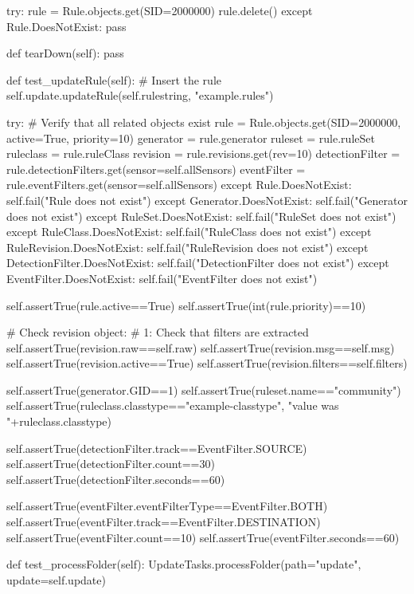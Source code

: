 \begin{python}[breaklines=true]
    try:
      rule = Rule.objects.get(SID=2000000)
      rule.delete()
    except Rule.DoesNotExist:
      pass


  def tearDown(self):
    pass


  def test_updateRule(self):
    # Insert the rule
    self.update.updateRule(self.rulestring, "example.rules")
    
    try:
      # Verify that all related objects exist
      rule = Rule.objects.get(SID=2000000, active=True, priority=10)
      generator = rule.generator
      ruleset = rule.ruleSet
      ruleclass = rule.ruleClass
      revision = rule.revisions.get(rev=10)
      detectionFilter = rule.detectionFilters.get(sensor=self.allSensors)
      eventFilter = rule.eventFilters.get(sensor=self.allSensors)
    except Rule.DoesNotExist:
      self.fail("Rule does not exist")
    except Generator.DoesNotExist:
      self.fail("Generator does not exist")
    except RuleSet.DoesNotExist:
      self.fail("RuleSet does not exist")
    except RuleClass.DoesNotExist:
      self.fail("RuleClass does not exist")
    except RuleRevision.DoesNotExist:
      self.fail("RuleRevision does not exist")
    except DetectionFilter.DoesNotExist:
      self.fail("DetectionFilter does not exist")
    except EventFilter.DoesNotExist:
      self.fail("EventFilter does not exist")  
    
    self.assertTrue(rule.active==True)
    self.assertTrue(int(rule.priority)==10)
    
    # Check revision object:
    # 1: Check that filters are extracted
    self.assertTrue(revision.raw==self.raw)
    self.assertTrue(revision.msg==self.msg)
    self.assertTrue(revision.active==True)
    self.assertTrue(revision.filters==self.filters)
    
    self.assertTrue(generator.GID==1)
    self.assertTrue(ruleset.name=="community")
    self.assertTrue(ruleclass.classtype=="example-classtype", "value was "+ruleclass.classtype)
    
    self.assertTrue(detectionFilter.track==EventFilter.SOURCE)
    self.assertTrue(detectionFilter.count==30)
    self.assertTrue(detectionFilter.seconds==60)
    
    self.assertTrue(eventFilter.eventFilterType==EventFilter.BOTH)
    self.assertTrue(eventFilter.track==EventFilter.DESTINATION)
    self.assertTrue(eventFilter.count==10)
    self.assertTrue(eventFilter.seconds==60)    
    
  def test_processFolder(self):
    UpdateTasks.processFolder(path="update", update=self.update)
    

\end{python}
